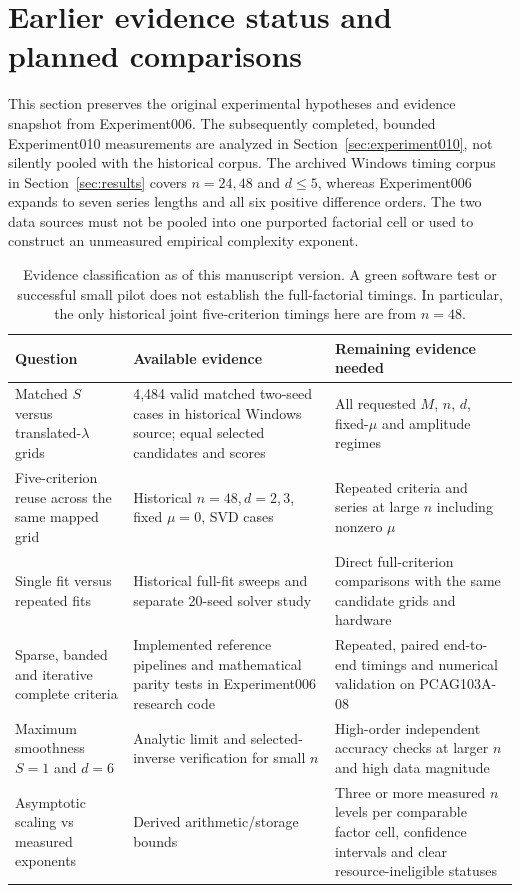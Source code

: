 \section{Earlier evidence status and planned comparisons}\label{sec:status}
This section preserves the original experimental hypotheses and evidence snapshot from Experiment006. The subsequently completed, bounded Experiment010 measurements are analyzed in Section~\ref{sec:experiment010}, not silently pooled with the historical corpus. The archived Windows timing corpus in Section~\ref{sec:results} covers $n=24,48$ and $d\leq5$, whereas Experiment006 expands to seven series lengths and all six positive difference orders. The two data sources must not be pooled into one purported factorial cell or used to construct an unmeasured empirical complexity exponent.

\begin{table}[t]\caption{Evidence classification as of this manuscript version. A green software test or successful small pilot does not establish the full-factorial timings. In particular, the only historical joint five-criterion timings here are from $n=48$.}\label{tab:coverage}\centering
\setlength{\tabcolsep}{4pt}
\begin{tabular}{@{}p{}p{}p{}@{}}\toprule
Question & Available evidence & Remaining evidence needed\\\midrule
Matched $S$ versus translated-$\lambda$ grids & 4,484 valid matched two-seed cases in historical Windows source; equal selected candidates and scores & All requested $M$, $n$, $d$, fixed-$\mu$ and amplitude regimes\\
Five-criterion reuse across the same mapped grid & Historical $n=48,d=2,3$, fixed $\mu=0$, SVD cases & Repeated criteria and series at large $n$ including nonzero $\mu$\\
Single fit versus repeated fits & Historical full-fit sweeps and separate 20-seed solver study & Direct full-criterion comparisons with the same candidate grids and hardware\\
Sparse, banded and iterative complete criteria & Implemented reference pipelines and mathematical parity tests in Experiment006 research code & Repeated, paired end-to-end timings and numerical validation on PCAG103A-08\\
Maximum smoothness $S=1$ and $d=6$ & Analytic limit and selected-inverse verification for small $n$ & High-order independent accuracy checks at larger $n$ and high data magnitude\\
Asymptotic scaling vs measured exponents & Derived arithmetic/storage bounds & Three or more measured $n$ levels per comparable factor cell, confidence intervals and clear resource-ineligible statuses\\
\bottomrule\end{tabular}
\end{table}

